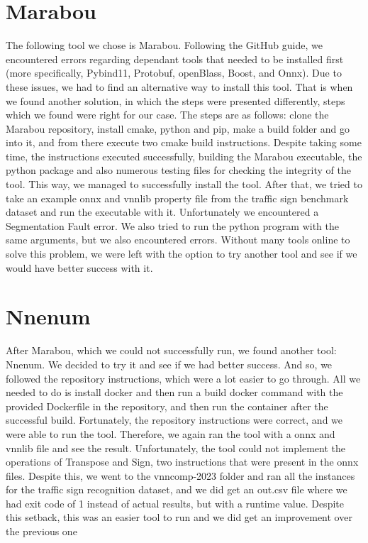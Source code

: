\documentclass[12pt,a4paper]{report}
\begin{document}
\newpage
\section{Marabou}
The following tool we chose is Marabou. Following the GitHub guide, we encountered errors regarding dependant tools that needed to be installed first (more specifically, Pybind11, Protobuf, openBlass, Boost, and Onnx). Due to these issues, we had to find an alternative way to install this tool. That is when we found another solution, in which the steps were presented differently, steps which we found were right for our case. The steps are as follows: clone the Marabou repository, install cmake, python and pip, make a build folder and go into it, and from there execute two cmake build instructions. Despite taking some time, the instructions executed successfully, building the Marabou executable, the python package and also numerous testing files for checking the integrity of the tool. This way, we managed to successfully install the tool. After that, we tried to take an example onnx and vnnlib property file from the traffic sign benchmark dataset and run the executable with it. Unfortunately we encountered a Segmentation Fault error. We also tried to run the python program with the same arguments, but we also encountered errors. Without many tools online to solve this problem, we were left with the option to try another tool and see if we would have better success with it.

\newpage
\section{Nnenum}
After Marabou, which we could not successfully run, we found another tool: Nnenum. We decided to try it and see if we had better success. And so, we followed the repository instructions, which were a lot easier to go through. All we needed to do is install docker and then run a build docker command with the provided Dockerfile in the repository, and then run the container after the successful build. Fortunately, the repository instructions were correct, and we were able to run the tool. Therefore, we again ran the tool with a onnx and vnnlib file and see the result. Unfortunately, the tool could not implement the operations of Transpose and Sign, two instructions that were present in the onnx files. Despite this, we went to the vnncomp-2023 folder and ran all the instances for the traffic sign recognition dataset, and we did get an out.csv file where we had exit code of 1 instead of actual results, but with a runtime value. Despite this setback, this was an easier tool to run and we did get an improvement over the previous one
\end{document}
